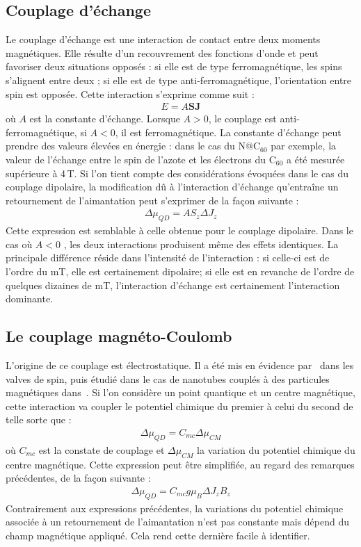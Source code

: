 \subsection{Couplage d'échange}
Le couplage d'échange est une interaction de contact entre deux moments magnétiques. Elle résulte d'un recouvrement des fonctions d'onde et peut favoriser deux situations opposés : si elle est de type ferromagnétique, les spins s'alignent entre deux ; si elle est de type anti-ferromagnétique, l'orientation entre spin est opposée. Cette interaction s'exprime comme suit :
\begin{eqnarray}
E = A\mathbf{SJ} \nonumber
\end{eqnarray}
où $A$ est la constante d'échange. Lorsque $A>0$, le couplage est anti-ferromagnétique, si $A<0$, il est ferromagnétique. La constante d'échange peut prendre des valeurs élevées en énergie : dans le cas du N@C$_{60}$ par exemple, la valeur de l'échange entre le spin de l'azote et les électrons du C$_{60}$ a été mesurée supérieure à 4\,T. Si l'on tient compte des considérations évoquées dans le cas du couplage dipolaire, la modification d\^u à l'interaction d'échange qu’entraîne un retournement de l'aimantation peut s'exprimer de la façon suivante :
\begin{eqnarray}
\Delta \mu_{QD} = AS_z\Delta J_z\nonumber
\end{eqnarray}
Cette expression est semblable à celle obtenue pour le couplage dipolaire. Dans le cas où $A<0$ , les deux interactions produisent même des effets identiques. La principale différence réside dans l'intensité de l'interaction : si celle-ci est de l'ordre du mT, elle est certainement dipolaire; si elle est en revanche de l'ordre de quelques dizaines de mT, l'interaction d'échange est certainement l'interaction dominante.

\subsection{Le couplage magnéto-Coulomb}
L'origine de ce couplage est électrostatique. Il a été mis en évidence par~\cite{Molen2006} dans les valves de spin, puis étudié dans le cas de nanotubes couplés à des particules magnétiques dans~\cite{Datta2011}. Si l'on considère un point quantique et un centre magnétique, cette interaction va coupler le potentiel chimique du premier à celui du second de telle sorte que :
\begin{eqnarray}
\Delta \mu_{QD} = C_{mc} \Delta \mu_{CM}
\end{eqnarray}
où $C_{mc}$ est la constate de couplage et $\Delta \mu_{CM}$ la variation du potentiel chimique du centre magnétique. Cette expression peut être simplifiée, au regard des remarques précédentes, de la façon suivante :
\begin{eqnarray}
\Delta \mu_{QD} = C_{mc} g \mu_B  \Delta J_z B_z
\end{eqnarray}
Contrairement aux expressions précédentes, la variations du potentiel chimique associée à un retournement de l'aimantation n'est pas constante mais dépend du champ magnétique appliqué. Cela rend cette dernière facile à identifier.

